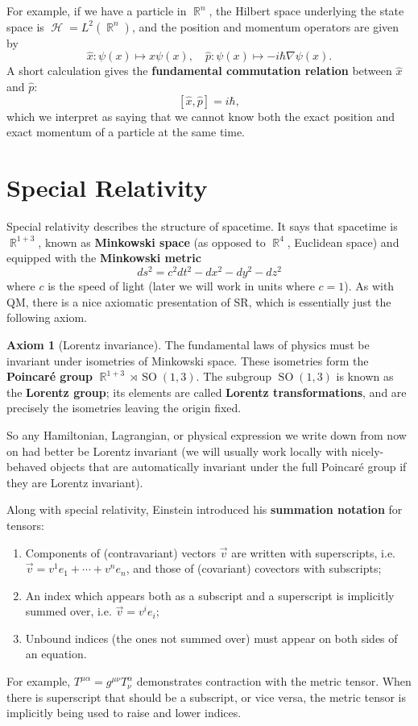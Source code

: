 \documentclass{report}
\theoremstyle{plain}
\theoremstyle{definition}
\newtheorem{axiom}{Axiom}
\theoremstyle{remark}
\DeclareMathOperator{\bR}{\mathbb{R}}
\DeclareMathOperator{\cH}{\mathcal{H}}
\DeclareMathOperator{\SO}{SO}
\begin{document}
For example, if we have a particle in $\bR^n$, the Hilbert space
underlying the state space is $\cH = L^2(\bR^n)$, and the position and
momentum operators are given by
$$ \hat{x}: \psi(x) \mapsto x\psi(x), \quad \hat{p}: \psi(x) \mapsto -i\hbar\nabla\psi(x). $$
A short calculation gives the {\bf fundamental commutation relation}
between $\hat{x}$ and $\hat{p}$:
$$ [\hat{x}, \hat{p}] = i\hbar, $$
which we interpret as saying that we cannot know both the exact
position and exact momentum of a particle at the same time.

\section{Special Relativity}

\setcounter{axiom}{0}

Special relativity describes the structure of spacetime. It says that
spacetime is $\bR^{1+3}$, known as {\bf Minkowski space} (as opposed
to $\bR^4$, Euclidean space) and equipped with the {\bf Minkowski
  metric}
$$ ds^2 = c^2 dt^2 - dx^2 - dy^2 - dz^2 $$
where $c$ is the speed of light (later we will work in units where
$c = 1$). As with QM, there is a nice axiomatic presentation of SR,
which is essentially just the following axiom.

\begin{axiom}[Lorentz invariance]
  The fundamental laws of physics must be invariant under isometries
  of Minkowski space. These isometries form the {\bf Poincar\'e group}
  $\bR^{1+3} \rtimes \SO(1,3)$. The subgroup $\SO(1,3)$ is known as
  the {\bf Lorentz group}; its elements are called {\bf Lorentz
    transformations}, and are precisely the isometries leaving the
  origin fixed.
\end{axiom}

So any Hamiltonian, Lagrangian, or physical expression we write down
from now on had better be Lorentz invariant (we will usually work
locally with nicely-behaved objects that are automatically invariant
under the full Poincar\'e group if they are Lorentz invariant).

Along with special relativity, Einstein introduced his {\bf summation
  notation} for tensors:
\begin{enumerate}
\item Components of (contravariant) vectors $\vec{v}$ are written with
  superscripts, i.e. $\vec{v} = v^1 e_1 + \cdots + v^n e_n$, and those
  of (covariant) covectors with subscripts;
\item An index which appears both as a subscript and a superscript is
  implicitly summed over, i.e. $\vec{v} = v^i e_i$;
\item Unbound indices (the ones not summed over) must appear on both
  sides of an equation.
\end{enumerate}
For example, $T^{\mu \alpha} = g^{\mu \nu} T^\alpha_\nu$ demonstrates
contraction with the metric tensor. When there is superscript that
should be a subscript, or vice versa, the metric tensor is implicitly
being used to raise and lower indices.
\end{document}
